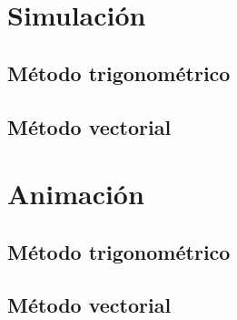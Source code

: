 \documentclass[12pt, final]{extarticle}
\begin{document}
\newpage
\section{Simulación}
\subsection{Método trigonométrico}

\subsection{Método vectorial}


\newpage
\section{Animación}
\subsection{Método trigonométrico}

\subsection{Método vectorial}


\nocite{*}
\vfill


\end{document}
